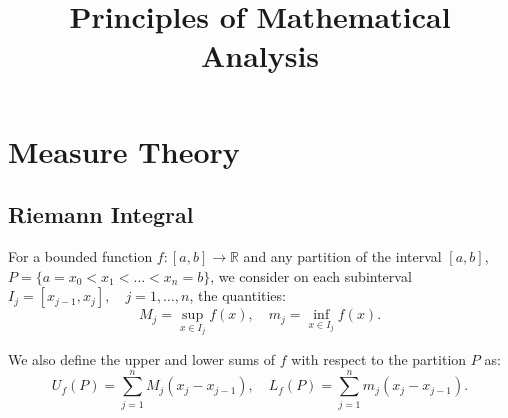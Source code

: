 \documentclass[11pt]{article}
\title{\textbf{Principles of Mathematical Analysis}}
\author{}
\date{}
\begin{document}
\maketitle

\section{Measure Theory}
\subsection{Riemann Integral}
For a bounded function \( f: [a, b] \to \mathbb{R} \) and any partition of the interval \([a, b]\), \(P = \{a = x_0 < x_1 < \ldots < x_n = b\}\), we consider on each subinterval \(I_j = [x_{j-1}, x_j], \quad j = 1, \ldots, n\), the quantities:
\[M_j = \sup_{x \in I_j} f(x), \quad m_j = \inf_{x \in I_j} f(x).\]

We also define the upper and lower sums of \(f\) with respect to the partition \(P\) as:
\[U_f(P) = \sum_{j=1}^{n} M_j (x_j - x_{j-1}), \quad L_f(P) = \sum_{j=1}^{n} m_j (x_j - x_{j-1}).\]
\end{document}
